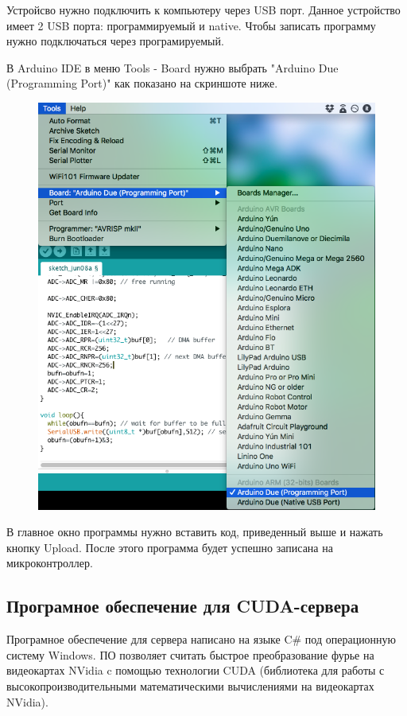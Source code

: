 \documentclass[../paper.tex]{subfiles}
\begin{document}
Устройсво нужно подключить к компьютеру через USB порт. Данное устройство имеет 2 USB порта: программируемый и native. Чтобы записать программу нужно подключаться через програмируемый.

В Arduino IDE в меню Tools - Board нужно выбрать "Arduino Due (Programming Port)" как показано на скриншоте ниже.
\begin{figure}[H]
\centering
\includegraphics[width=16cm]{images/ard-board-select.png}
\end{figure}

В главное окно программы нужно вставить код, приведенный выше и нажать кнопку Upload. После этого программа будет успешно записана на микроконтроллер.

\subsection{Програмное обеспечение для CUDA-сервера}
Програмное обеспечение для сервера написано на языке C\# под операционную систему Windows. ПО позволяет считать быстрое преобразование фурье на видеокартах NVidia c помощью технологии CUDA (библиотека для работы с высокопроизводительными математическими вычислениями на видеокартах NVidia).
\end{document}
